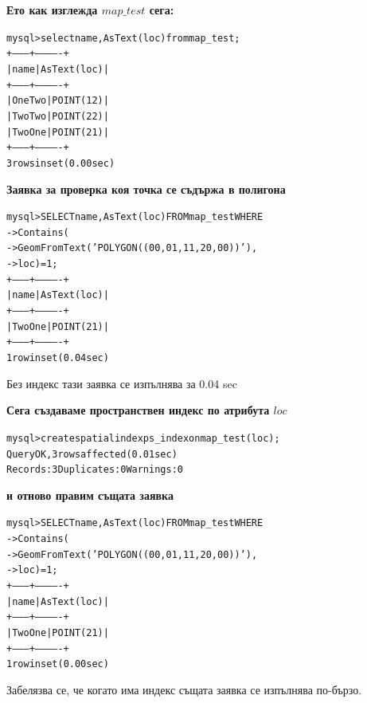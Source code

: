 \documentclass[a4paper,10pt]{article}
\begin{document}
\textbf{Ето как изглежда $map\_test$ сега:}

\begin{alltt}
mysql> select name, AsText(loc) from map_test;
+---------+-------------+
| name    | AsText(loc) |
+---------+-------------+
| One Two | POINT(1 2)  |
| Two Two | POINT(2 2)  |
| Two One | POINT(2 1)  |
+---------+-------------+
3 rows in set (0.00 sec)
\end{alltt}

\textbf{Заявка за проверка коя точка се съдържа в полигона}

\begin{alltt}
mysql> SELECT name, AsText(loc) FROM map_test WHERE
    -> Contains(
    -> GeomFromText('POLYGON((0 0, 0 1, 1 1, 2 0, 0 0))'),
    -> loc) = 1;
+---------+-------------+
| name    | AsText(loc) |
+---------+-------------+
| Two One | POINT(2 1)  |
+---------+-------------+
1 row in set (0.04 sec)
\end{alltt}
Без индекс тази заявка се изпълнява за 0.04 sec

\textbf{Сега създаваме пространствен индекс по атрибута $loc$}

\begin{alltt}
mysql> create spatial index ps_index on map_test(loc);
Query OK, 3 rows affected (0.01 sec)
Records: 3  Duplicates: 0  Warnings: 0
\end{alltt}

\textbf{и отново правим същата заявка}

\begin{alltt}
mysql>  SELECT name, AsText(loc) FROM map_test WHERE
    ->  Contains(
    ->  GeomFromText('POLYGON((0 0, 0 1, 1 1, 2 0, 0 0))'),
    ->  loc) = 1;
+---------+-------------+
| name    | AsText(loc) |
+---------+-------------+
| Two One | POINT(2 1)  |
+---------+-------------+
1 row in set (0.00 sec)
\end{alltt}
Забелязва се, че когато има индекс същата заявка се изпълнява по-бързо.
\end{document}
